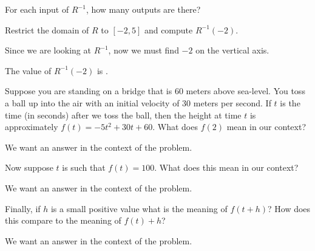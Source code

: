 \begin{shuffle}
\begin{question}
\begin{multiple-choice}
\end{multiple-choice}
\begin{solution}
\begin{hint}
For each input of $R^{-1}$, how many outputs are there?
\end{hint}
\end{solution}
Restrict the domain of $R$ to $[-2,5]$ and compute $R^{-1}(-2)$.
\begin{solution}
\begin{hint}
Since we are looking at $R^{-1}$, now we must find $-2$ on the vertical axis. 
\end{hint}
The value of $R^{-1}(-2)$ is .
\end{solution}
\end{question}
\end{shuffle}








\begin{question} 
Suppose you are standing on a bridge that is 60 meters above
sea-level. You toss a ball up into the air with an initial velocity of
30 meters per second.  If $t$ is the time (in seconds) after we toss
the ball, then the height at time $t$ is approximately $f(t) = -5 t^2
+30t+60$. What does $f(2)$ mean in our context?
\begin{solution}
\begin{hint}
We want an answer in the context of the problem. 
\end{hint}
\end{solution}
Now suppose $t$ is such that $f(t) = 100$. What does this mean in our
context?
\begin{solution}
\begin{hint}
We want an answer in the context of the problem. 
\end{hint}
\end{solution}
Finally, if $h$ is a small positive value what is the meaning of
$f(t+h)$? How does this compare to the meaning of $f(t)+h$?
\begin{solution}
\begin{hint}
We want an answer in the context of the problem. 
\end{hint}
\end{solution}
\end{question}



